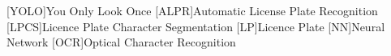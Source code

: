 [YOLO]{You Only Look Once}
[ALPR]{Automatic License Plate Recognition}
[LPCS]{Licence Plate Character Segmentation}
[LP]{Licence Plate}
[NN]{Neural Network}
[OCR]{Optical Character Recognition}

